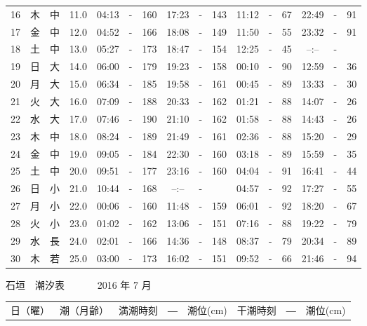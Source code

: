 \documentclass[12pt.a4j]{jsarticle}
\begin{document}
\begin{center}
\begin{table}[ht]
\begin{tabular}{|rc|cr|ccrccr|ccrccr|}
16 & 木 & 中 & 11.0 &  04:13 &-& 160  &  17:23 &-& 143  &   11:12 &-&  67  &   22:49 &-&  91  \\
17 & 金 & 中 & 12.0 &  04:52 &-& 166  &  18:08 &-& 149  &   11:50 &-&  55  &   23:32 &-&  91  \\
18 & 土 & 中 & 13.0 &  05:27 &-& 173  &  18:47 &-& 154  &   12:25 &-&  45  &   --:-- &-&     \\
19 & 日 & 大 & 14.0 &  06:00 &-& 179  &  19:23 &-& 158  &   00:10 &-&  90  &   12:59 &-&  36  \\
20 & 月 & 大 & 15.0 &  06:34 &-& 185  &  19:58 &-& 161  &   00:45 &-&  89  &   13:33 &-&  30  \\
21 & 火 & 大 & 16.0 &  07:09 &-& 188  &  20:33 &-& 162  &   01:21 &-&  88  &   14:07 &-&  26  \\
22 & 水 & 大 & 17.0 &  07:46 &-& 190  &  21:10 &-& 162  &   01:58 &-&  88  &   14:43 &-&  26  \\
23 & 木 & 中 & 18.0 &  08:24 &-& 189  &  21:49 &-& 161  &   02:36 &-&  88  &   15:20 &-&  29  \\
24 & 金 & 中 & 19.0 &  09:05 &-& 184  &  22:30 &-& 160  &   03:18 &-&  89  &   15:59 &-&  35  \\
25 & 土 & 中 & 20.0 &  09:51 &-& 177  &  23:16 &-& 160  &   04:04 &-&  91  &   16:41 &-&  44  \\
26 & 日 & 小 & 21.0 &  10:44 &-& 168  &  --:-- &-&     &   04:57 &-&  92  &   17:27 &-&  55  \\
27 & 月 & 小 & 22.0 &  00:06 &-& 160  &  11:48 &-& 159  &   06:01 &-&  92  &   18:20 &-&  67  \\
28 & 火 & 小 & 23.0 &  01:02 &-& 162  &  13:06 &-& 151  &   07:16 &-&  88  &   19:22 &-&  79  \\
29 & 水 & 長 & 24.0 &  02:01 &-& 166  &  14:36 &-& 148  &   08:37 &-&  79  &   20:34 &-&  89  \\
30 & 木 & 若 & 25.0 &  03:00 &-& 173  &  16:02 &-& 151  &   09:52 &-&  66  &   21:46 &-&  94  \\
   \hline
   \end{tabular}
\end{table}
\newpage
 {\LARGE 石垣　潮汐表　　　}
 {\large 2016 年  7 月}\\
 \begin{table}[ht]
    \begin{tabular}{|rc|cr|ccrccr|ccrccr|}
    \hline
    \multicolumn{2}{|c|}{日（曜）} & \multicolumn{2}{c|}{潮（月齢）} & \multicolumn{6}{c|}{満潮時刻　―　潮位(cm)} & \multicolumn{6}{c|}{干潮時刻　―　潮位(cm)} \\

\end{tabular}
\end{table}
\end{center}
\end{document}

